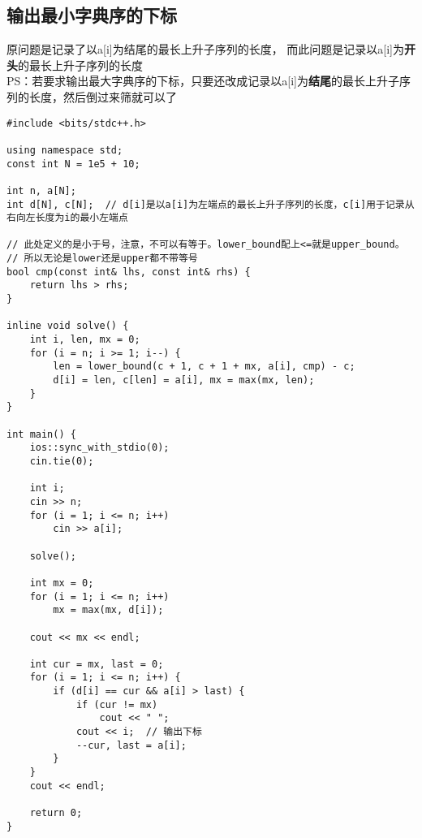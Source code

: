    \subsection{输出最小字典序的下标}
        原问题是记录了以a[i]为结尾的最长上升子序列的长度，
        而此问题是记录以a[i]为\textbf{开头}的最长上升子序列的长度\\
        PS：若要求输出最大字典序的下标，只要还改成记录以a[i]为\textbf{结尾}的最长上升子序列的长度，然后倒过来筛就可以了
\begin{lstlisting}
#include <bits/stdc++.h>

using namespace std;
const int N = 1e5 + 10;

int n, a[N];
int d[N], c[N];  // d[i]是以a[i]为左端点的最长上升子序列的长度，c[i]用于记录从右向左长度为i的最小左端点

// 此处定义的是小于号，注意，不可以有等于。lower_bound配上<=就是upper_bound。
// 所以无论是lower还是upper都不带等号
bool cmp(const int& lhs, const int& rhs) {
    return lhs > rhs;
}

inline void solve() {
    int i, len, mx = 0;
    for (i = n; i >= 1; i--) {
        len = lower_bound(c + 1, c + 1 + mx, a[i], cmp) - c;
        d[i] = len, c[len] = a[i], mx = max(mx, len);
    }
}

int main() {
    ios::sync_with_stdio(0);
    cin.tie(0);

    int i;
    cin >> n;
    for (i = 1; i <= n; i++)
        cin >> a[i];

    solve();

    int mx = 0;
    for (i = 1; i <= n; i++)
        mx = max(mx, d[i]);

    cout << mx << endl;

    int cur = mx, last = 0;
    for (i = 1; i <= n; i++) {
        if (d[i] == cur && a[i] > last) {
            if (cur != mx)
                cout << " ";
            cout << i;  // 输出下标
            --cur, last = a[i];
        }
    }
    cout << endl;

    return 0;
}
\end{lstlisting}

